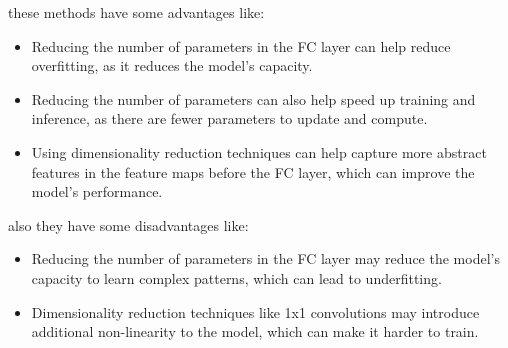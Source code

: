 \begin{qsolve}
\begin{qsolve}[]
        these methods have some advantages like:
        \begin{itemize}
            \item Reducing the number of parameters in the FC layer can help reduce overfitting, as it reduces the model's capacity.
            \item Reducing the number of parameters can also help speed up training and inference, as there are fewer parameters to update and compute.
            \item Using dimensionality reduction techniques can help capture more abstract features in the feature maps before the FC layer, which can improve the model's performance.
        \end{itemize}
        also they have some disadvantages like:
        \begin{itemize}
            \item Reducing the number of parameters in the FC layer may reduce the model's capacity to learn complex patterns, which can lead to underfitting.
            \item Dimensionality reduction techniques like 1x1 convolutions may introduce additional non-linearity to the model, which can make it harder to train.
        \end{itemize}
        

    \end{qsolve}
\end{qsolve}
